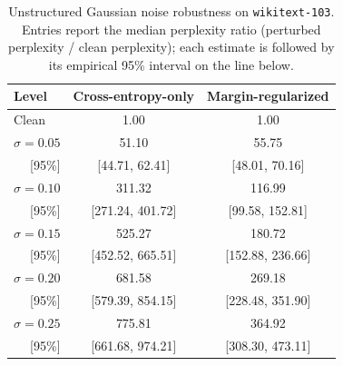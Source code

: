 \documentclass[11pt]{article}
\begin{document}
\begin{table}[H]
\centering
\caption{Unstructured Gaussian noise robustness on \texttt{wikitext-103}.
Entries report the median perplexity ratio (perturbed perplexity / clean perplexity); each estimate is followed by its empirical 95\% interval on the line below.}
\label{tab:appendix_robustness_wikitext_gaussian}
\small
\begin{tabular}{lcc}
\toprule
\textbf{Level} & \textbf{Cross-entropy-only} & \textbf{Margin-regularized} \\
\midrule
Clean & 1.00 & 1.00 \\
$\sigma{=}0.05$ & 51.10 & 55.75 \\
\multicolumn{1}{r}{\footnotesize [95\%]} & \footnotesize [44.71, 62.41] & \footnotesize [48.01, 70.16] \\
$\sigma{=}0.10$ & 311.32 & 116.99 \\
\multicolumn{1}{r}{\footnotesize [95\%]} & \footnotesize [271.24, 401.72] & \footnotesize [99.58, 152.81] \\
$\sigma{=}0.15$ & 525.27 & 180.72 \\
\multicolumn{1}{r}{\footnotesize [95\%]} & \footnotesize [452.52, 665.51] & \footnotesize [152.88, 236.66] \\
$\sigma{=}0.20$ & 681.58 & 269.18 \\
\multicolumn{1}{r}{\footnotesize [95\%]} & \footnotesize [579.39, 854.15] & \footnotesize [228.48, 351.90] \\
$\sigma{=}0.25$ & 775.81 & 364.92 \\
\multicolumn{1}{r}{\footnotesize [95\%]} & \footnotesize [661.68, 974.21] & \footnotesize [308.30, 473.11] \\
\bottomrule
\end{tabular}
\end{table}
\end{document}

